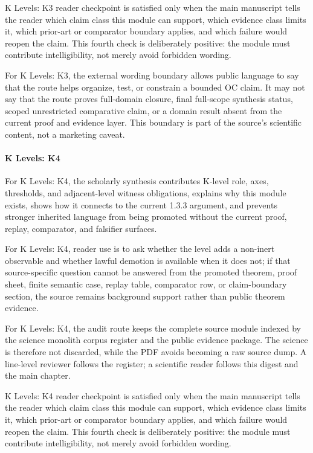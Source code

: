 K Levels: K3 reader checkpoint is satisfied only when the main manuscript tells the reader which claim class this module can support, which evidence class limits it, which prior-art or comparator boundary applies, and which failure would reopen the claim. This fourth check is deliberately positive: the module must contribute intelligibility, not merely avoid forbidden wording.


For K Levels: K3, the external wording boundary allows public language to say that the route helps organize, test, or constrain a bounded OC claim. It may not say that the route proves full-domain closure, final full-scope synthesis status, scoped unrestricted comparative claim, or a domain result absent from the current proof and evidence layer. This boundary is part of the source's scientific content, not a marketing caveat.


\paragraph{K Levels: K4}

For K Levels: K4, the scholarly synthesis contributes K-level role, axes, thresholds, and adjacent-level witness obligations, explains why this module exists, shows how it connects to the current 1.3.3 argument, and prevents stronger inherited language from being promoted without the current proof, replay, comparator, and falsifier surfaces.


For K Levels: K4, reader use is to ask whether the level adds a non-inert observable and whether lawful demotion is available when it does not; if that source-specific question cannot be answered from the promoted theorem, proof sheet, finite semantic case, replay table, comparator row, or claim-boundary section, the source remains background support rather than public theorem evidence.


For K Levels: K4, the audit route keeps the complete source module indexed by the science monolith corpus register and the public evidence package. The science is therefore not discarded, while the PDF avoids becoming a raw source dump. A line-level reviewer follows the register; a scientific reader follows this digest and the main chapter.


K Levels: K4 reader checkpoint is satisfied only when the main manuscript tells the reader which claim class this module can support, which evidence class limits it, which prior-art or comparator boundary applies, and which failure would reopen the claim. This fourth check is deliberately positive: the module must contribute intelligibility, not merely avoid forbidden wording.


